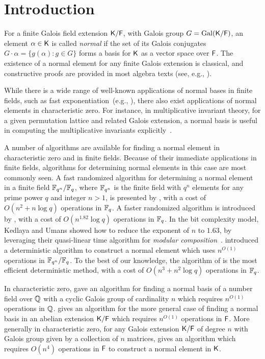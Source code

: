 \section{Introduction}

For a finite Galois field extension ${\mathsf{K}}/{\mathsf{F}}$, with Galois group $G =
\mathrm{Gal}({\mathsf{K}}/{\mathsf{F}})$, an element $\alpha \in {\mathsf{K}}$ is called
\emph{normal} if the set of its Galois conjugates $G \cdot \alpha = \{
g(\alpha): g\in G\}$ forms a basis for ${\mathsf{K}}$ as a vector space over
${\mathsf{F}}$. The existence of a normal element for any finite Galois extension
is classical, and constructive proofs are provided in most algebra
texts (see, e.g., \citep[Section 6.13]{Lang}).
 
While there is a wide range of well-known applications of normal bases in
finite fields, such as fast exponentiation~(e.g., \citep{GaGaPaSh00}), there also
exist applications of normal elements in characteristic zero.  For instance,
in multiplicative invariant theory, for a given permutation lattice and
related Galois extension, a normal basis is useful in computing the
multiplicative invariants explicitly~\citep*{Jam18}.

A number of algorithms are available for finding a normal element in
characteristic zero and in finite fields.  Because of their immediate
applications in finite fields, algorithms for determining normal
elements in this case are most commonly seen.  A fast randomized
algorithm for determining a normal element in a finite field
${\mathbb{F}}_{q^n}/{\mathbb{F}}_q$, where ${\mathbb{F}}_{q^n}$ is the finite field with $q^n$
elements for any prime power $q$ and integer $n>1$, is presented by
, with a cost of $O(n^2+n\log q)$ operations in
${\mathbb{F}}_q$.  A faster randomized algorithm is introduced by
, with a cost of $O(n^{1.82}\log q)$ operations in
${\mathbb{F}}_q$.  In the bit complexity model, Kedlaya and Umans showed how to
reduce the exponent of $n$ to $1.63$, by leveraging their quasi-linear
time algorithm for {\em modular
  composition}~\citep{KeUm11}. \cite{LenstraNormal} introduced a
deterministic algorithm to construct a normal element which uses
$n^{O(1)}$ operations in ${\mathbb{F}}_{q^n}/{\mathbb{F}}_q$.  To the best of our
knowledge, the algorithm of \cite{AugCam94} is the most efficient
deterministic method, with a cost of $O(n^3+n^2\log q)$ operations in
${\mathbb{F}}_q$.

In characteristic zero, \cite{SchSte93} gave an algorithm for finding
a normal basis of a number field over $\mathbb{Q}$ with a cyclic Galois group
of cardinality $n$ which requires $n^{O(1)}$ operations in $\mathbb{Q}$.
\cite{Pol94} gives an algorithm for the more general case of finding a
normal basis in an abelian extension ${\mathsf{K}}/{\mathsf{F}}$ which requires $n^{O(1)}$
operations in ${\mathsf{F}}$.  More generally in characteristic zero, for any
Galois extension ${\mathsf{K}}/{\mathsf{F}}$ of degree $n$ with Galois group given by a
collection of $n$ matrices, \cite{Girstmair} gives an algorithm which
requires $O(n^4)$ operations in ${\mathsf{F}}$ to construct a normal element in
${\mathsf{K}}$.

